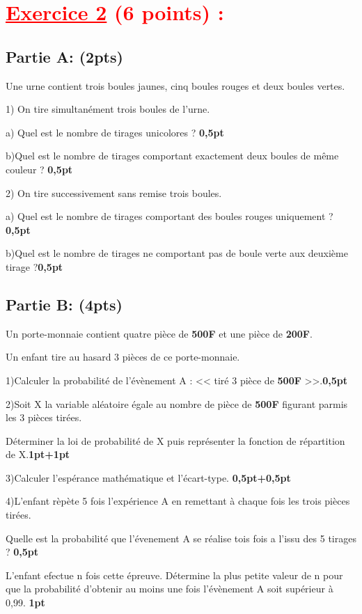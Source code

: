 \documentclass[12pt]{article}
\begin{document}
\section*{\textcolor{red}{\underline{Exercice 2} (6 points) :}}
\subsection*{Partie A: (2pts)}
Une urne contient trois boules jaunes, cinq boules rouges et deux boules vertes.

1) On tire simultanément trois boules de l'urne.

a) Quel est le nombre de tirages unicolores ? \textbf{0,5pt}

b)Quel est le nombre de tirages comportant exactement deux boules de même couleur ? \textbf{0,5pt}

2) On tire successivement sans remise trois boules.

a) Quel est le nombre de tirages comportant des boules rouges uniquement ? \textbf{0,5pt}

b)Quel est le nombre de tirages ne comportant pas de boule verte aux deuxième tirage ?\textbf{0,5pt}
\subsection*{Partie B: (4pts)}
Un porte-monnaie contient quatre pièce de \textbf{500F} et une pièce de \textbf{200F}.

Un enfant tire au hasard 3 pièces de ce porte-monnaie.

1)Calculer la probabilité de l'évènement A : << tiré 3 pièce de \textbf{500F} >>.\textbf{0,5pt}

2)Soit X la variable aléatoire égale au nombre de pièce de \textbf{500F} figurant parmis les 3 pièces tirées.

Déterminer la loi de probabilité de X puis représenter la fonction de répartition de X.\textbf{1pt+1pt}

3)Calculer l'espérance mathématique et l'écart-type. \textbf{0,5pt+0,5pt}

4)L'enfant rèpète 5 fois l'expérience A en remettant à chaque fois les trois pièces tirées.

Quelle est la probabilité que l'évenement A se réalise tois fois a l'issu des 5 tirages ? \textbf{0,5pt}

L'enfant efectue n fois cette épreuve. Détermine la plus petite valeur de n pour que la probabilité d'obtenir au moins une fois l'évènement A soit supérieur à 0,99. \textbf{1pt}
\end{document}
